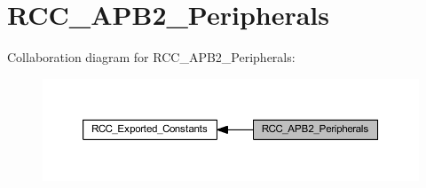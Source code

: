 \hypertarget{group___r_c_c___a_p_b2___peripherals}{}\section{R\+C\+C\+\_\+\+A\+P\+B2\+\_\+\+Peripherals}
\label{group___r_c_c___a_p_b2___peripherals}
Collaboration diagram for R\+C\+C\+\_\+\+A\+P\+B2\+\_\+\+Peripherals\+:
\nopagebreak
\begin{figure}[H]
\begin{center}
\leavevmode
\includegraphics[width=350pt]{group___r_c_c___a_p_b2___peripherals}
\end{center}
\end{figure}
